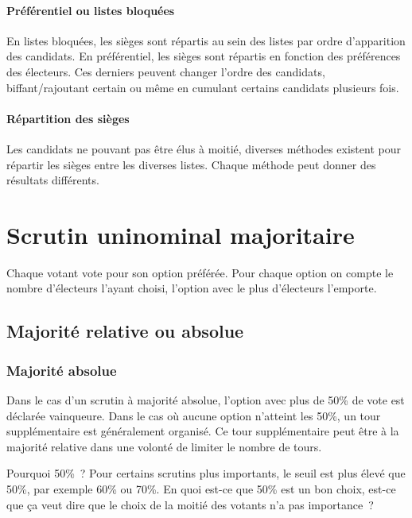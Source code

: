 \documentclass[../report]{subfiles}
\begin{document}
  \paragraph{Préférentiel ou listes bloquées}

  En listes bloquées, les sièges sont répartis au sein des listes par ordre d'apparition 
  des candidats.
  En préférentiel, les sièges sont répartis en fonction des préférences des électeurs.
  Ces derniers peuvent changer l'ordre des candidats, biffant/rajoutant certain ou même
  en cumulant certains candidats plusieurs fois.
  
  \paragraph{Répartition des sièges}

  Les candidats ne pouvant pas être élus à moitié, diverses méthodes existent pour répartir
  les sièges entre les diverses listes.
  Chaque méthode peut donner des résultats différents.
  
  \section{Scrutin uninominal majoritaire}\label{diff:scrutin-majoritaire}
  
  Chaque votant vote pour son option préférée.
  Pour chaque option on compte le nombre d'électeurs l'ayant choisi, l'option avec le plus 
  d'électeurs l'emporte.
  
  \subsection{Majorité relative ou absolue}
  \subsubsection{Majorité absolue}
  Dans le cas d'un scrutin à majorité absolue, l'option avec plus de 50\% de vote est déclarée
  vainqueure.
  Dans le cas où aucune option n'atteint les 50\%, un tour supplémentaire est généralement
  organisé.
  Ce tour supplémentaire peut être à la majorité relative dans une volonté de limiter le nombre
  de tours.
  
  \begin{nota}{Pourquoi 50\%~?}
    Pour certains scrutins plus importants, le seuil est plus élevé que 50\%, par exemple 60\% ou 70\%. 
    En quoi est-ce que 50\% est un bon choix, est-ce que ça veut dire que le choix de la moitié
    des votants n'a pas importance~? 
  \end{nota}
  
\end{document}
